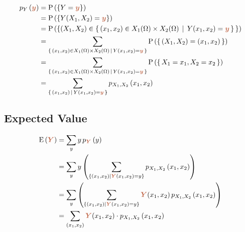 \documentclass{article}
\DeclareRobustCommand{\myRandV}[1]{#1} %
\newcommand{\myPMF}[2]{p_{#1}\left(#2\right)}
\newcommand{\myP}[1]{\operatorname{P}\left(#1\right)} %
\newcommand{\myExpect}[1]{\operatorname{E}\left(#1\right)} %
\newcommand{\myParam}[1]{\textcolor{myParamColor}{\bm{#1}}}
\begin{document}
\begin{equation*}
\begin{aligned}
    \myPMF{\myRandV{Y}}{\myParam{y}} &= \myP{\{\myRandV{Y} = \myParam{y}\}} \\
    &= \myP{\left\{\myRandV{Y}(\myRandV{X_1}, \myRandV{X_2}) = \myParam{y}\right\}} \\
    &= \myP{\left\{ ( \myRandV{X_1}, \myRandV{X_2} ) \in \left\{\, ( x_1, x_2) \in \myRandV{X_1}(\Omega) \times \myRandV{X_2}(\Omega) \, \mid \, \myRandV{Y}(x_1, x_2) = \myParam{y} \,\right\}\,\right\}} \\
    &= \sum_{\left\{\, (x_1, x_2) \in \myRandV{X_1}(\Omega) \times \myRandV{X_2}(\Omega) \, \mid \, \myRandV{Y}(x_1, x_2) = \myParam{y} \,\right\}} \myP{\left\{\, (\myRandV{X_1}, \myRandV{X_2}) = (x_1, x_2) \,\right\}} \\
    &= \sum_{\left\{\, (x_1, x_2) \in \myRandV{X_1}(\Omega) \times \myRandV{X_2}(\Omega) \, \mid \, \myRandV{Y}(x_1, x_2) = \myParam{y} \,\right\}} \myP{\left\{\, \myRandV{X_1} = x_1, \myRandV{X_2} = x_2 \,\right\}} \\
    &= \sum_{\left\{\, (x_1, x_2) \, \mid \, \myRandV{Y}(x_1, x_2) = \myParam{y} \,\right\}} \myPMF{\myRandV{X_1}, \myRandV{X_2}}{x_1, x_2} \\
\end{aligned}
\end{equation*}

\subsection{Expected Value}

\begin{equation*}
\begin{aligned}
    \myExpect{\myParam{\myRandV{Y}}} &= \sum_{y} y \, \myPMF{\myParam{\myRandV{Y}}}{y} \\
    &= \sum_{y} y \left(\sum_{\{ (x_1, x_2) \mid \myParam{\myRandV{Y}}(x_1, x_2) = y\}} \myPMF{\myRandV{X_1, X_2}}{x_1, x_2}\right) \\
    &= \sum_{y} \left(\sum_{\{ (x_1, x_2) \mid \myParam{\myRandV{Y}}(x_1, x_2) = y\}} \myParam{\myRandV{Y}}(x_1, x_2) \, \myPMF{\myRandV{X_1, X_2}}{x_1, x_2}\right) \\
    &= \sum_{(x_1, x_2)} \myParam{\myRandV{Y}}(x_1, x_2) \cdot \myPMF{X_1, X_2}{x_1, x_2}
\end{aligned}
\end{equation*}

\newpage
\end{document}
